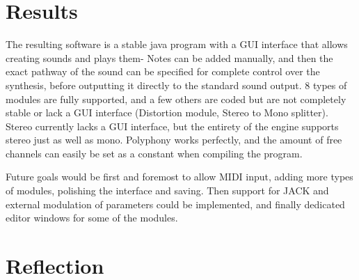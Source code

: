 \documentclass[11pt,a4paper]{article}
\begin{document}
\clearpage

\section{Results}

The resulting software is a stable java program with a GUI interface that allows creating sounds and plays them- Notes can be added manually, and then the exact pathway of the sound can be specified for complete control over the synthesis, before outputting it directly to the standard sound output. 8 types of modules are fully supported, and a few others are coded but are not completely stable or lack a GUI interface (Distortion module, Stereo to Mono splitter). Stereo currently lacks a GUI interface, but the entirety of the engine supports stereo just as well as mono. Polyphony works perfectly, and the amount of free channels can easily be set as a constant when compiling the program.

Future goals would be first and foremost to allow MIDI input, adding more types of modules, polishing the interface and saving. Then support for JACK and external modulation of parameters could be implemented, and finally dedicated editor windows for some of the modules.

\section{Reflection}


\end{document}
